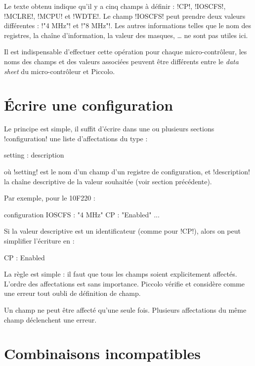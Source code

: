 Le texte obtenu indique qu'il y a cinq champs à définir : \pic!CP!, \pic!IOSCFS!, \pic!MCLRE!, \pic!MCPU! et \pic!WDTE!. Le champ \pic!IOSCFS! peut prendre deux valeurs différentes : \pic!"4 MHz"! et \pic!"8 MHz"!. Les autres informations telles que le nom des registres, la chaîne d'information, la valeur des masques, … ne sont pas utiles ici.

Il est indispensable d'effectuer cette opération pour chaque micro-contrôleur, les noms des champs et des valeurs associées peuvent être différents entre le \emph{data sheet} du micro-contrôleur et Piccolo.

\section{Écrire une configuration}

Le principe est simple, il suffit d’écrire dans une ou plusieurs sections \pic!configuration! une liste d’affectations du type :

\begin{piccolo}
setting : description
\end{piccolo}

où \pic!setting! est le nom d’un champ d’un registre de configuration, et \pic!description! la chaîne descriptive de la valeur souhaitée (voir section précédente).

Par exemple, pour le 10F220 :

\begin{piccolo}
configuration {
  IOSCFS : "4 MHz"
  CP : "Enabled"
  ...
}
\end{piccolo}

Si la valeur descriptive est un identificateur (comme pour \pic!CP!), alors on peut simplifier l’écriture en :

\begin{piccolo}
  CP : Enabled
\end{piccolo}

La règle est simple : il faut que tous les champs soient explicitement affectés. L’ordre des affectations est sans importance. Piccolo vérifie et considère comme une erreur tout oubli de définition de champ.

Un champ ne peut être affecté qu’une seule fois. Plusieurs affectations du même champ déclenchent une erreur.


\section{Combinaisons incompatibles}



